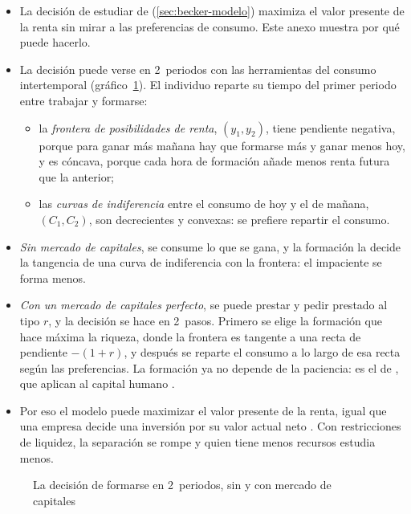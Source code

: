 \documentclass[11pt]{article}
\begin{document}
\begin{itemize}
\item La decisión de estudiar de  (\ref{sec:becker-modelo}) maximiza el valor presente de la renta sin mirar a las preferencias de consumo. Este anexo muestra por qué puede hacerlo.
\item La decisión puede verse en 2~periodos con las herramientas del consumo intertemporal (gráfico~\ref{fig:fisher-capital-humano}). El individuo reparte su tiempo del primer periodo entre trabajar y formarse:
  \begin{itemize}
  \item la \emph{frontera de posibilidades de renta}, $(y_1,y_2)$, tiene pendiente negativa, porque para ganar más mañana hay que formarse más y ganar menos hoy, y es cóncava, porque cada hora de formación añade menos renta futura que la anterior;
  \item las \emph{curvas de indiferencia} entre el consumo de hoy y el de mañana, $(C_1,C_2)$, son decrecientes y convexas: se prefiere repartir el consumo.
  \end{itemize}
\item \emph{Sin mercado de capitales}, se consume lo que se gana, y la formación la decide la tangencia de una curva de indiferencia con la frontera: el impaciente se forma menos.
\item \emph{Con un mercado de capitales perfecto}, se puede prestar y pedir prestado al tipo $r$, y la decisión se hace en 2~pasos. Primero se elige la formación que hace máxima la riqueza, donde la frontera es tangente a una recta de pendiente $-(1+r)$, y después se reparte el consumo a lo largo de esa recta según las preferencias. La formación ya no depende de la paciencia: es el  de \nocite{Fisher1930Theory}, que \textcite[cap.~1]{AcemogluAutor2011Lectures} aplican al capital humano .
\item Por eso el modelo puede maximizar el valor presente de la renta, igual que una empresa decide una inversión por su valor actual neto . Con restricciones de liquidez, la separación se rompe y quien tiene menos recursos estudia menos.
\end{itemize}

\begin{figure}[H]
\centering
\caption{La decisión de formarse en 2~periodos, sin y con mercado de capitales}\label{fig:fisher-capital-humano}
\end{figure}
\end{document}
